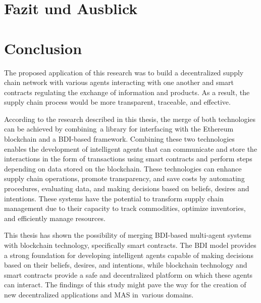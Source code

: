 {\chapter{Fazit und Ausblick}}
{\chapter{Conclusion}}

\label{sec:conclusion}

The proposed application of this research was to build a decentralized supply chain network with various agents interacting with one another and smart contracts regulating the exchange of information and products. As a result, the supply chain process would be more transparent, traceable, and effective. 

\vspace{.5cm}

According to the research described in this thesis, the merge of both technologies can be achieved by combining a library for interfacing with the Ethereum blockchain and a \ac{BDI}-based framework. Combining these two technologies enables the development of intelligent agents that can communicate and store the interactions in the form of transactions using smart contracts and perform steps depending on data stored on the blockchain. These technologies can enhance supply chain operations, promote transparency, and save costs by automating procedures, evaluating data, and making decisions based on beliefs, desires and intentions. These systems have the potential to transform supply chain management due to their capacity to track commodities, optimize inventories, and efficiently manage resources.

\vspace{.5cm}

This thesis has shown the possibility of merging \ac{BDI}-based multi-agent systems with blockchain technology, specifically smart contracts. The \ac{BDI} model provides a strong foundation for developing intelligent agents capable of making decisions based on their beliefs, desires, and intentions, while blockchain technology and smart contracts provide a safe and decentralized platform on which these agents can interact. The findings of this study might pave the way for the creation of new decentralized applications and \ac{MAS} in various domains.


